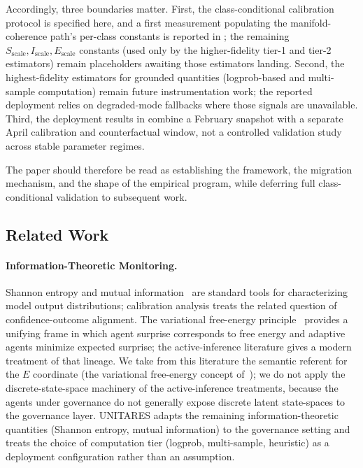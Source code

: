 \documentclass[11pt,twocolumn]{article}
\begin{document}
Accordingly, three boundaries matter. First, the class-conditional
calibration protocol is specified here, and a first measurement
populating the manifold-coherence path's per-class constants is
reported in ; the remaining
$S_{\text{scale}}, I_{\text{scale}}, E_{\text{scale}}$ constants
(used only by the higher-fidelity tier-1 and tier-2 estimators)
remain placeholders awaiting those estimators landing. Second, the
highest-fidelity estimators for grounded quantities (logprob-based
and multi-sample computation) remain future instrumentation work;
the reported deployment relies on degraded-mode fallbacks where
those signals are unavailable. Third, the deployment results in
 combine a February snapshot with a separate
April calibration and counterfactual window, not a controlled
validation study across stable parameter regimes.

The paper should therefore be read as establishing the framework, the
migration mechanism, and the shape of the empirical program, while
deferring full class-conditional validation to subsequent work.

\subsection{Related Work}

\paragraph{Information-Theoretic Monitoring.}
Shannon entropy and mutual information~\cite{shannon1948} are standard tools for
characterizing model output distributions; calibration analysis
\cite{guo2017calibration} treats the related question of
confidence-outcome alignment. The variational free-energy
principle~\cite{friston2010free} provides a unifying frame in
which agent surprise corresponds to free energy and adaptive
agents minimize expected surprise; the active-inference literature
\cite{dacosta2020active,sajid2021active,smith2022step,parr2022active}
gives a modern treatment of that lineage. We take from this
literature the semantic referent for the $E$ coordinate (the
variational free-energy concept of~\cite{friston2010free}); we do
not apply the discrete-state-space machinery of the active-inference
treatments, because the agents under governance do not generally
expose discrete latent state-spaces to the governance layer.
UNITARES adapts the remaining information-theoretic quantities
(Shannon entropy, mutual information) to the governance setting
and treats the choice of computation tier (logprob, multi-sample,
heuristic) as a deployment configuration rather than an
assumption.
\end{document}
